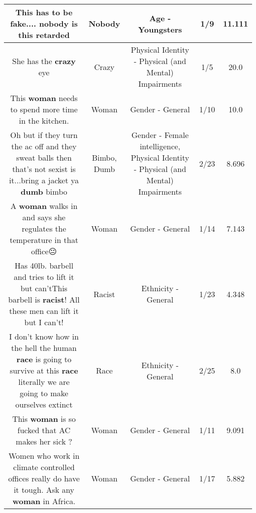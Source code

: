 \documentclass[11pt]{article}
\newlength\mylength
\begin{document}
\begin{center}
\begin{longtable}{|C{.65\mylength}|C{.30\mylength}|C{.12\mylength}|C{.12\mylength}|C{.12\mylength}|}
  \small This has to be fake.... \textbf{nobody} is this retarded\normalsize   & Nobody & Age - Youngsters & 1/9 & 11.111 \\  \hline
  \small She has the \textbf{crazy} eye\normalsize   & Crazy & Physical Identity - Physical (and Mental) Impairments & 1/5 & 20.0 \\  \hline
  \small This \textbf{woman} needs to spend more time in the kitchen.\normalsize   & Woman & Gender - General & 1/10 & 10.0 \\  \hline
  \small Oh but if they turn the ac off and they sweat balls then that's not sexist is it...bring a jacket ya \textbf{dumb} bimbo\normalsize   & Bimbo, Dumb & Gender - Female intelligence, Physical Identity - Physical (and Mental) Impairments & 2/23 & 8.696 \\  \hline
  \small A \textbf{woman} walks in and says she regulates the temperature in that office😐\normalsize   & Woman & Gender - General & 1/14 & 7.143 \\  \hline
  \small Has 40lb. barbell and tries to lift it but can'tThis barbell is \textbf{racist}! All these men can lift it but I can't!\normalsize   & Racist & Ethnicity - General & 1/23 & 4.348 \\  \hline
  \small I don't know how in the hell the human \textbf{race} is going to survive at this \textbf{race} literally we are going to make ourselves extinct\normalsize   & Race & Ethnicity - General & 2/25 & 8.0 \\  \hline
  \small This \textbf{woman} is so fucked that AC makes her sick ?\normalsize   & Woman & Gender - General & 1/11 & 9.091 \\  \hline
  \small Women who work in climate controlled offices really do have it tough. Ask any \textbf{woman} in Africa.\normalsize   & Woman & Gender - General & 1/17 & 5.882 \\  \hline

\end{longtable}
\end{center}
\end{document}
